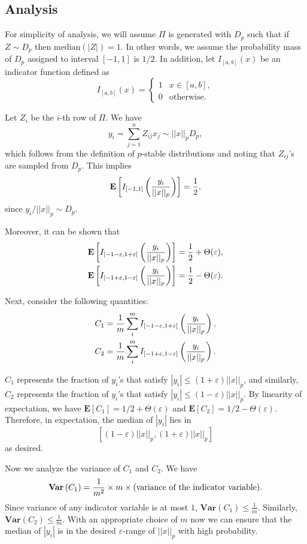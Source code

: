 \documentclass[11pt]{article}
\newcommand{\eps}{\varepsilon}
\begin{document}
\subsection{Analysis}
For simplicity of analysis, we will assume $\Pi$ is generated with $D_p$ such that if $Z\sim D_p$ then $\text{median}(|Z|) = 1$. In other words, we assume the probability mass of $D_p$ assigned to interval $[-1,1]$ is $1/2$. In addition, let $I_{[a,b]}(x)$ be an indicator function defined as
$$I_{[a,b]}(x)=\begin{cases}
1 & x\in[a,b],\\
0 & \text{otherwise}.
\end{cases}$$

Let $Z_i$ be the $i$-th row of $\Pi$. We have 
\begin{equation} \label{eq:yi}
y_i = \sum_{j=1}^n Z_{ij} x_j \sim ||x||_p D_p,
\end{equation}
which follows from the definition of $p$-stable distributions and noting that $Z_{ij}$'s are sampled from $D_p$. This implies 
\begin{equation} 
\mathbf{E} \left[ I_{[-1,1]} \left(\frac{y_i}{||x||_p}\right) \right] = \frac{1}{2},
\end{equation}
since $y_i / ||x||_p \sim D_p$.

Moreover, it can be shown that
\begin{align}
\mathbf{E} \ppp{I_{[-1-\eps,1+\eps]}\pp{\frac{y_{i}}{||x||_{p}}}} &= \frac{1}{2}+\Theta(\eps), \\
\mathbf{E} \ppp{I_{[-1+\eps,1-\eps]}\pp{\frac{y_{i}}{||x||_{p}}}} &= \frac{1}{2}-\Theta(\eps).
\end{align}

Next, consider the following quantities:
\begin{align}
C_1 &= \frac{1}{m} \sum_i^m I_{[-1-\eps,1+\eps]}\pp{\frac{y_{i}}{||x||_{p}}}, \\
C_2 &= \frac{1}{m} \sum_i^m I_{[-1+\eps,1-\eps]}\pp{\frac{y_{i}}{||x||_{p}}}.
\end{align}

$C_1$ represents the fraction of $y_i$'s that satisfy $|y_i|\le (1+\eps) ||x||_p$, and similarly, $C_2$ represents the fraction of $y_i$'s that satisfy $|y_i|\le (1-\eps) ||x||_p$. By linearity of expectation, we have $\mathbf{E} [C_1] = 1/2 + \Theta(\eps)$ and $\mathbf{E} [C_2] = 1/2 - \Theta(\eps)$. Therefore, in expectation, the median of $|y_i|$ lies in $$[(1-\eps)||x||_p, (1+\eps)||x||_p]$$ as desired.

Now we analyze the variance of $C_1$ and $C_2$. We have
\begin{equation}
\mathbf{Var}\left(C_1\right)=\frac{1}{m^{2}}\times m\times\text{(variance of the indicator variable)}.
\end{equation}
Since variance of any indicator variable is at most $1$, $\mathbf{Var} (C_1)\le \frac{1}{m}$. Similarly, $\mathbf{Var}(C_2)\le \frac{1}{m}$. With an appropriate choice of $m$ now we can ensure that the median of $|y_i|$ is in the desired $\eps$-range of $||x||_p$ with high probability.
\end{document}
